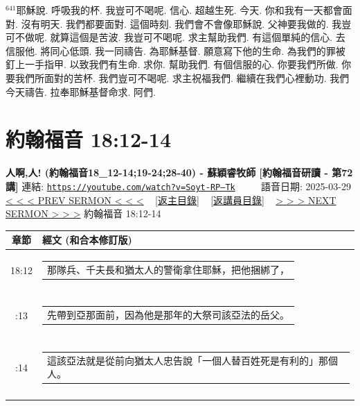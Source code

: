 \documentclass{book}
\begin{document}
$^{641}$耶穌說.
呼吸我的杯.
我豈可不喝呢.
信心.
超越生死.
今天.
你和我有一天都會面對.
沒有明天.
我們都要面對.
這個時刻.
我們會不會像耶穌說.
父神要我做的.
我豈可不做呢.
就算這個是苦波.
我豈可不喝呢.
求主幫助我們.
有這個單純的信心.
去信服他.
將同心低頭.
我一同禱告.
為耶穌基督.
願意寫下他的生命.
為我們的罪被釘上一手指甲.
以致我們有生命.
求你.
幫助我們.
有個信服的心.
你要我們所做.
你要我們所面對的苦杯.
我們豈可不喝呢.
求主祝福我們.
繼續在我們心裡動功.
我們今天禱告.
拉奉耶穌基督命求.
阿們.
\newpage



\section{約翰福音 18:12-14}
\label{sec:Soyt_RP__Tk}
\textbf{人啊,人! (約翰福音18\_12-14;19-24;28-40) - 蘇穎睿牧師 [約翰福音研讀 - 第72講]}
\newline
\newline
連結: \href{https://youtube.com/watch?v=Soyt-RP--Tk}{\texttt{https://youtube.com/watch?v=Soyt-RP--Tk}} ~~~~ 語音日期: 2025-03-29
\newline
\newline
\hyperref[sec:OFW3ofO9w3Y]{< < < PREV SERMON < < <}
~
\hyperlink{toc}{[返主目錄]}
~
\hyperref[ch:preacher11]{[返講員目錄]}
~
\hyperref[sec:8Xvna8FV9_s]{> > > NEXT SERMON > > >}
\newline
\newline
約翰福音 18:12-14
\newline
\begin{longtable}{cl}
\hline
\hline
章節 & 經文 (和合本修訂版)\\
\hline
18:12 & \begin{tabularx}{0.7\textwidth}{X} 那隊兵、千夫長和猶太人的警衛拿住耶穌，把他捆綁了， \end{tabularx} \\ \\ \relax
18:13 & \begin{tabularx}{0.7\textwidth}{X} 先帶到亞那面前，因為他是那年的大祭司該亞法的岳父。 \end{tabularx} \\ \\ \relax
18:14 & \begin{tabularx}{0.7\textwidth}{X} 這該亞法就是從前向猶太人忠告說「一個人替百姓死是有利的」那個人。 \end{tabularx} \\ \\
[1ex]
\hline
\hline
\end{longtable}
\end{document}
